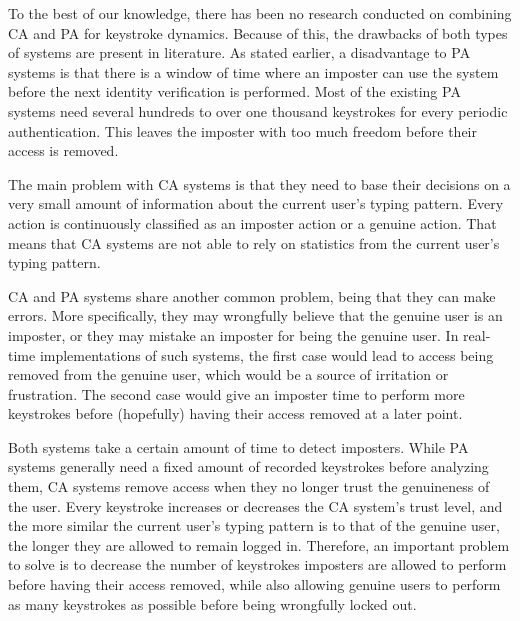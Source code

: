 \documentclass[informationsecurity]{gucmasterproject}
\begin{document}
To the best of our knowledge, there has been no research conducted on combining CA and PA for keystroke dynamics.
Because of this, the drawbacks of both types of systems are present in literature.
As stated earlier, a disadvantage to PA systems is that there is a window of time where an imposter can use the system before the next identity verification is performed.
Most of the existing PA systems need several hundreds to over one thousand keystrokes for every periodic authentication.
This leaves the imposter with too much freedom before their access is removed.

The main problem with CA systems is that they need to base their decisions on a very small amount of information about the current user's typing pattern.
Every action is continuously classified as an imposter action or a genuine action. 
That means that CA systems are not able to rely on statistics from the current user's typing pattern.

CA and PA systems share another common problem, being that they can make errors.
More specifically, they may wrongfully believe that the genuine user is an imposter, or they may mistake an imposter for being the genuine user.
In real-time implementations of such systems, the first case would lead to access being removed from the genuine user, which would be a source of irritation or frustration.
The second case would give an imposter time to perform more keystrokes before (hopefully) having their access removed at a later point.

Both systems take a certain amount of time to detect imposters.
While PA systems generally need a fixed amount of recorded keystrokes before analyzing them, CA systems remove access when they no longer trust the genuineness of the user.
Every keystroke increases or decreases the CA system's trust level, and the more similar the current user's typing pattern is to that of the genuine user, the longer they are allowed to remain logged in. 
Therefore, an important problem to solve is to decrease the number of keystrokes imposters are allowed to perform before having their access removed, while also allowing genuine users to perform as many keystrokes as possible before being wrongfully locked out.

\end{document}
